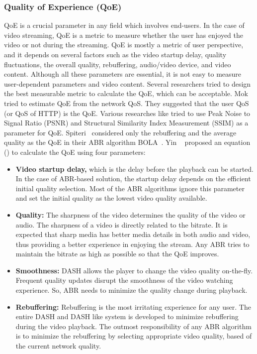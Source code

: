 \subsubsection{Quality of Experience (QoE)}
QoE is a crucial parameter in any field which involves end-users. In the case of video streaming, QoE is a metric to measure whether the user has enjoyed the video or not during the streaming. QoE is mostly a metric of user perspective, and it depends on several factors such as the video startup delay, quality fluctuations, the overall quality, rebuffering, audio/video device, and video content. Although all these parameters are essential, it is not easy to measure user-dependent parameters and video content. Several researchers tried to design the best measurable metric to calculate the QoE, which can be acceptable. Mok \etal \cite{5990550} tried to estimate QoE from the network QoS. They suggested that the user QoS (or QoS of HTTP) is the QoE. Various researches like \cite{10.1145/2155555.2155558,10.1145/3394171.3413512} tried to use Peak Noise to Signal Ratio (PSNR) and Structural Similarity Index Measurement (SSIM) as a parameter for QoE. Spiteri \etal\ considered only the rebuffering and the average quality as the QoE in their ABR algorithm BOLA~\cite{Spiteri2016}. Yin \etal~\cite{yin2015control} proposed an equation (\eqn{\ref{eqn:QoE}}) to calculate the QoE using four parameters:
\begin{itemize}
	\item {\bf Video startup delay,} which is the delay before the playback can be started. In the case of ABR-based solution, the startup delay depends on the efficient initial quality selection. Most of the ABR algorithms ignore this parameter and set the initial quality as the lowest video quality available.
	\item {\bf Quality:} The sharpness of the video determines the quality of the video or audio. The sharpness of a video is directly related to the bitrate. It is expected that sharp media has better media details in both audio and video, thus providing a better experience in enjoying the stream. Any ABR tries to maintain the bitrate as high as possible so that the QoE improves.
	\item {\bf Smoothness:} DASH allows the player to change the video quality on-the-fly. Frequent quality updates disrupt the smoothness of the video watching experience. So, ABR needs to minimize the quality change during playback.
	\item {\bf Rebuffering:} Rebuffering is the most irritating experience for any user. The entire DASH and DASH like system is developed to minimize rebuffering during the video playback. The outmost responsibility of any ABR algorithm is to minimize the rebuffering by selecting appropriate video quality, based of the current network quality.
\end{itemize}
